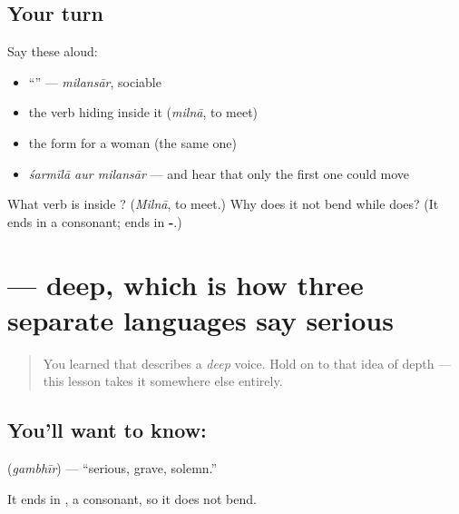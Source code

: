 \subsection*{Your turn}
Say these aloud:

\begin{itemize}
\raggedright
  \item \textquotedblleft{}\textquotedblright{} — \emph{milansār}, sociable
  \item the verb hiding inside it (\emph{milnā}, to meet)
  \item the form for a woman (the same one)
  \item \emph{śarmīlā aur milansār} — and hear that only the first one could move
\end{itemize}

\begin{tcolorbox}[breakable,colback=teal!4,colframe=teal!35!black,title={Before you move on}]
What verb is inside \textbf{}? (\emph{Milnā}, to meet.) Why does it not bend while \textbf{} does? (It ends in a consonant; \textbf{} ends in \textbf{-}.)
\end{tcolorbox}
\section[\texorpdfstring{\hi{गंभीर} (gambhīr)}{गंभीर (gambhīr)}]{ — deep, which is how three separate languages say serious}

\label{lesson:HI-C83-gambhir}



\begin{quote}
You learned that \textbf{} describes a \emph{deep} voice. Hold on to that idea of depth — this lesson takes it somewhere else entirely.
\end{quote}

\subsection*{You'll want to know: }
\textbf{} (\emph{gambhīr}) — \textquotedblleft{}serious, grave, solemn.\textquotedblright{}

It ends in \textbf{}, a consonant, so it does not bend.

